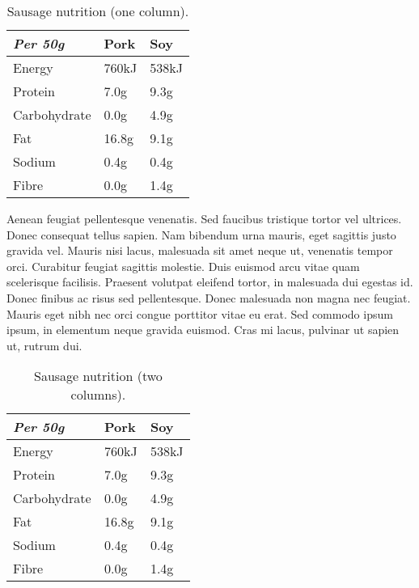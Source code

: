 \documentclass{mathcryptology} %
\begin{document}
\begin{table}[h] %
	\centering %
	\caption{Sausage nutrition (one column).}
	\begin{tabular}{l l l}
		\toprule
		\textit{Per 50g} & \textbf{Pork} & \textbf{Soy} \\
		\midrule
		Energy & 760kJ & 538kJ\\
		Protein & 7.0g & 9.3g\\
		Carbohydrate & 0.0g & 4.9g\\
		Fat & 16.8g & 9.1g\\
		Sodium & 0.4g & 0.4g\\
		Fibre & 0.0g & 1.4g\\
		\bottomrule
	\end{tabular}
	\label{tab:onecolumn} %
\end{table}

Aenean feugiat pellentesque venenatis. Sed faucibus tristique tortor vel ultrices. Donec consequat tellus sapien. Nam bibendum urna mauris, eget sagittis justo gravida vel. Mauris nisi lacus, malesuada sit amet neque ut, venenatis tempor orci. Curabitur feugiat sagittis molestie. Duis euismod arcu vitae quam scelerisque facilisis. Praesent volutpat eleifend tortor, in malesuada dui egestas id. Donec finibus ac risus sed pellentesque. Donec malesuada non magna nec feugiat. Mauris eget nibh nec orci congue porttitor vitae eu erat. Sed commodo ipsum ipsum, in elementum neque gravida euismod. Cras mi lacus, pulvinar ut sapien ut, rutrum dui.

\begin{table*}[bp] %
	\centering %
	\caption{Sausage nutrition (two columns).}
	\begin{tabular}{p{0.25\linewidth} p{0.1\linewidth} p{0.1\linewidth}}
		\toprule
		\textit{Per 50g} & \textbf{Pork} & \textbf{Soy} \\
		\midrule
		Energy & 760kJ & 538kJ\\
		Protein & 7.0g & 9.3g\\
		Carbohydrate & 0.0g & 4.9g\\
		Fat & 16.8g & 9.1g\\
		Sodium & 0.4g & 0.4g\\
		Fibre & 0.0g & 1.4g\\
		\bottomrule
	\end{tabular}
	\label{tab:twocolumn} %
\end{table*}
\end{document}
